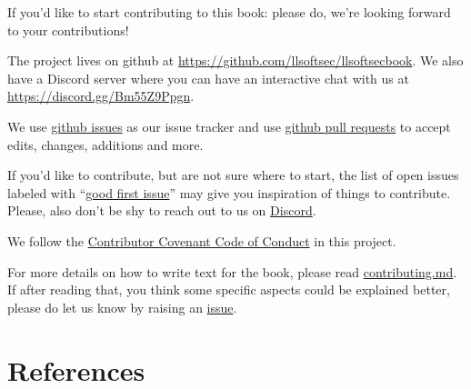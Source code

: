 \documentclass[
  a4paper,
]{report}
\begin{document}
If you'd like to start contributing to this book: please do, we're
looking forward to your contributions!

The project lives on github at
\url{https://github.com/llsoftsec/llsoftsecbook}. We also have a Discord
server where you can have an interactive chat with us at
\url{https://discord.gg/Bm55Z9Ppgn}.

We use \href{https://github.com/llsoftsec/llsoftsecbook/issues}{github
issues} as our issue tracker and use
\href{https://github.com/llsoftsec/llsoftsecbook/pulls}{github pull
requests} to accept edits, changes, additions and more.

If you'd like to contribute, but are not sure where to start, the list
of open issues labeled with
``\href{https://github.com/llsoftsec/llsoftsecbook/issues?q=is\%3Aissue+is\%3Aopen+label\%3A\%22good+first+issue\%22}{good
first issue}'' may give you inspiration of things to contribute. Please,
also don't be shy to reach out to us on
\href{https://discord.gg/Bm55Z9Ppgn}{Discord}.

We follow the
\href{https://github.com/llsoftsec/llsoftsecbook/blob/main/CODE_OF_CONDUCT.md}{Contributor
Covenant Code of Conduct} in this project.

For more details on how to write text for the book, please read
\href{https://github.com/llsoftsec/llsoftsecbook/blob/main/contributing.md}{contributing.md}.
If after reading that, you think some specific aspects could be
explained better, please do let us know by raising an
\href{https://github.com/llsoftsec/llsoftsecbook/issues/new}{issue}.

\printindex

\chapter*{References}\label{references}
\end{document}
